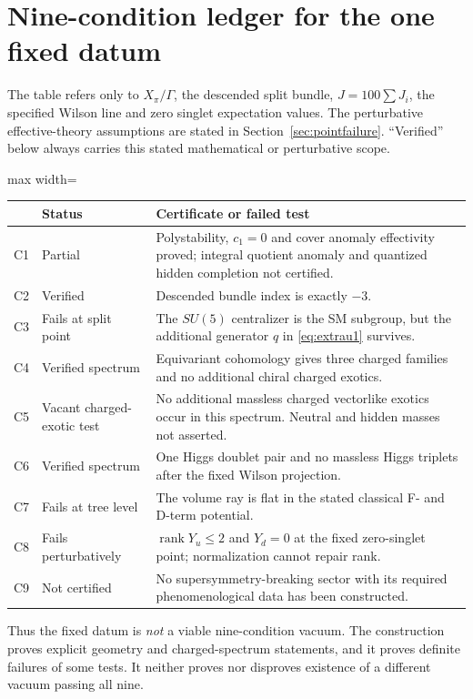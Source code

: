 \section{Nine-condition ledger for the one fixed datum}\label{sec:ledger}
The table refers only to $X_\pi/\Gamma$, the descended split bundle,
$J=100\sum J_i$, the specified Wilson line and zero singlet expectation
values. The perturbative effective-theory assumptions are stated in
Section~\ref{sec:pointfailure}. ``Verified'' below always carries this
stated mathematical or perturbative scope.
\begin{center}\small
\begin{adjustbox}{max width=\linewidth}\begin{tabular}{@{}p{.06\linewidth}p{.18\linewidth}p{.65\linewidth}@{}}
\toprule
&Status&Certificate or failed test\\\midrule
C1&Partial&Polystability, $c_1=0$ and cover anomaly effectivity proved;
integral quotient anomaly and quantized hidden completion not certified.\\
C2&Verified&Descended bundle index is exactly $-3$.\\
C3&Fails at split point&The $SU(5)$ centralizer is the SM subgroup,
but the additional generator $q$ in \eqref{eq:extrau1} survives.\\
C4&Verified spectrum&Equivariant cohomology gives three charged families
and no additional chiral charged exotics.\\
C5&Vacant charged-exotic test&No additional massless charged vectorlike
exotics occur in this spectrum. Neutral and hidden masses not asserted.\\
C6&Verified spectrum&One Higgs doublet pair and no massless Higgs triplets
after the fixed Wilson projection.\\
C7&Fails at tree level&The volume ray is flat in the stated classical
F- and D-term potential.\\
C8&Fails perturbatively&$\operatorname{rank}Y_u\le2$ and $Y_d=0$ at the
fixed zero-singlet point; normalization cannot repair rank.\\
C9&Not certified&No supersymmetry-breaking sector with its required
phenomenological data has been constructed.\\\bottomrule
\end{tabular}\end{adjustbox}
\end{center}
Thus the fixed datum is \emph{not} a viable nine-condition vacuum.
The construction proves explicit geometry and charged-spectrum statements,
and it proves definite failures of some tests. It neither proves nor
disproves existence of a different vacuum passing all nine.

